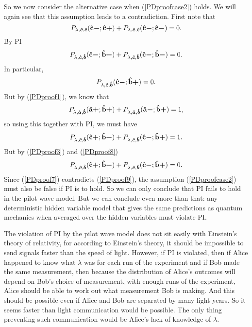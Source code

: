 So we now consider the alternative case when (\ref{PDproofcase2}) holds. We will again see that this assumption leads to a contradiction. First note that
\begin{equation}
 P_{\lambda,\bm{\hat{c}},\bm{\hat{c}}}(\vb{\hat{{c}}}\bm{-};\vb{\hat{{c}}}\bm{+})+P_{\lambda,\bm{\hat{c}},\bm{\hat{c}}}(\vb{\hat{{c}}}\bm{-};\vb{\hat{{c}}}\bm{-})=0.
\end{equation}
 By PI
\begin{equation}
P_{\lambda,\bm{\hat{c}},\bm{\hat{b}}}(\vb{\hat{{c}}}\bm{-};\vb{\hat{{b}}}\bm{+})+P_{\lambda,\bm{\hat{c}},\bm{\hat{b}}}(\vb{\hat{{c}}}\bm{-};\vb{\hat{{b}}}\bm{-})=0.
\end{equation}
In particular, 
\begin{equation}\label{PDproof8}
P_{\lambda,\bm{\hat{c}},\bm{\hat{b}}}(\vb{\hat{{c}}}\bm{-};\vb{\hat{{b}}}\bm{+})=0.
\end{equation}
   But by (\ref{PDproof1}), we know that 
  \begin{equation}
  P_{\lambda,\bm{\hat{a}},\bm{\hat{b}}}(\vb{\hat{{a}}}\bm{+};\vb{\hat{{b}}}\bm{+})+P_{\lambda,\bm{\hat{a}},\bm{\hat{b}}}(\vb{\hat{{a}}}\bm{-};\vb{\hat{{b}}}\bm{+})=1,
  \end{equation}   
 so using this together with PI, we must have
    \begin{equation}\label{PDproof7}
  P_{\lambda,\bm{\hat{c}},\bm{\hat{b}}}(\vb{\hat{{c}}}\bm{+};\vb{\hat{{b}}}\bm{+})+P_{\lambda,\bm{\hat{c}},\bm{\hat{b}}}(\vb{\hat{{c}}}\bm{-};\vb{\hat{{b}}}\bm{+})=1.
  \end{equation} 
   But by (\ref{PDproof3}) and (\ref{PDproof8})
\begin{equation}\label{PDproof9}
 P_{\lambda,\bm{\hat{c}},\bm{\hat{b}}}(\vb{\hat{{c}}}\bm{+};\vb{\hat{{b}}}\bm{+})+P_{\lambda,\bm{\hat{c}},\bm{\hat{b}}}(\vb{\hat{{c}}}\bm{-};\vb{\hat{{b}}}\bm{+})=0.
\end{equation}
Since (\ref{PDproof7}) contradicts (\ref{PDproof9}), the assumption (\ref{PDproofcase2}) must also be false if PI is to hold. So we can only conclude that PI fails to hold in the pilot wave model.   But we can conclude even more than that: any deterministic hidden variable model that gives the same predictions as quantum mechanics when averaged over the hidden variables must violate PI. 

The violation of PI by the pilot wave model does not sit easily with Einstein's theory of relativity, for according to Einstein's theory, it should be impossible to send signals faster than the speed of light. However, if PI is violated, then if Alice happened to know what $\lambda$ was for each run of the experiment and if Bob made the same measurement, then because the distribution of Alice's outcomes will depend on Bob's choice of measurement, with enough runs of the experiment, Alice should be able to work out what measurement Bob is making. And this should be possible even if Alice and Bob are separated by many light years. So it seems faster than light communication would be possible. The only thing preventing such communication would be Alice's lack of knowledge of $\lambda$. 

